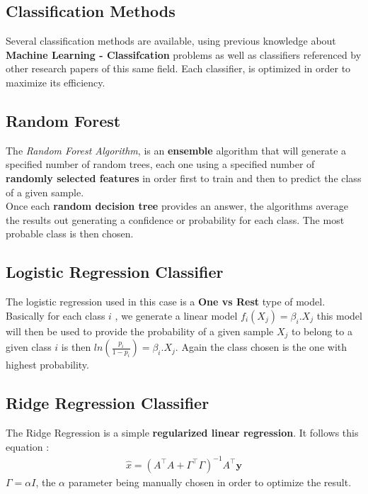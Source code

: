 \documentclass{bioinfo}
\begin{document}
\newpage

\begin{methods}
\section{Classification Methods}

Several classification methods are available, using previous knowledge about \textbf{Machine Learning - Classifcation} problems as well as classifiers referenced by other research papers of this same field. Each classifier, is optimized in order to maximize its efficiency.

\subsection{Random Forest}

The \textit{Random Forest Algorithm}, is an \textbf{ensemble} algorithm that will generate a specified number of random trees, each one using a specified number of \textbf{randomly selected features} in order first to train and then to predict the class of a given sample. \\
Once each \textbf{random decision tree} provides an answer, the algorithms average the results out  generating a confidence or probability for each class. The most probable class is then chosen.


\subsection{Logistic Regression Classifier}

The logistic regression used in this case is a \textbf{One vs Rest} type of model. Basically for each class $i$ , we generate a linear model $f_i(X_j) = \beta_i . X_j$ this model will then be used to provide the probability of a given sample $X_j$ to belong to a given class $i$ is then $ln(\frac{p_i}{1-p_i}) = \beta_i . X_j$. Again the class chosen is the one with highest probability. 

\subsection{Ridge Regression Classifier}

The Ridge Regression is a simple \textbf{regularized linear regression}. It follows this equation : 
\begin{align*}
	{\displaystyle {\hat {x}}=(A^{\top }A+\Gamma ^{\top }\Gamma )^{-1}A^{\top }\mathbf {y} }
\end{align*}
$\Gamma =\alpha I$, the $\alpha$ parameter being manually chosen in order to optimize the result.


\end{methods}
\end{document}
